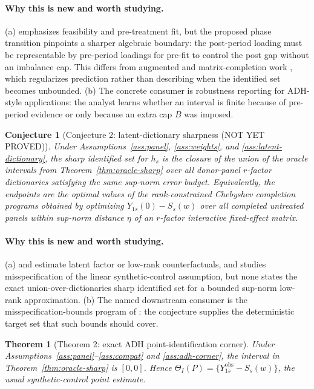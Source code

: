 \documentclass[11pt]{article}
\theoremstyle{definition}
\theoremstyle{plain}
\newtheorem{theorem}{Theorem}
\newtheorem{conjecture}{Conjecture}
\theoremstyle{remark}
\begin{document}
\paragraph{Why this is new and worth studying.}
(a) \citet{Abadie2021} emphasizes feasibility and pre-treatment fit, but the proposed phase transition pinpoints a sharper algebraic boundary: the post-period loading must be representable by pre-period loadings for pre-fit to control the post gap without an imbalance cap. This differs from augmented and matrix-completion work \citep{BenMichaelFellerRothstein2021,AtheyBayatiDoudchenkoImbensKhosravi2021}, which regularizes prediction rather than describing when the identified set becomes unbounded. (b) The concrete consumer is robustness reporting for ADH-style applications: the analyst learns whether an interval is finite because of pre-period evidence or only because an extra cap \(B\) was imposed.

\begin{conjecture}[Conjecture 2: latent-dictionary sharpness (NOT YET PROVED)]\label{conj:latent-dictionary}
Under Assumptions~\ref{ass:panel}, \ref{ass:weights}, and \ref{ass:latent-dictionary}, the sharp identified set for \(h_s\) is the closure of the union of the oracle intervals from Theorem~\ref{thm:oracle-sharp} over all donor-panel \(r\)-factor dictionaries satisfying the same sup-norm error budget. Equivalently, the endpoints are the optimal values of the rank-constrained Chebyshev completion programs obtained by optimizing \(Y_{1s}(0)-S_s(w)\) over all completed untreated panels within sup-norm distance \(\eta\) of an \(r\)-factor interactive fixed-effect matrix.
\end{conjecture}

\paragraph{Why this is new and worth studying.}
(a) \citet{Xu2017} and \citet{AtheyBayatiDoudchenkoImbensKhosravi2021} estimate latent factor or low-rank counterfactuals, and \citet{NazaretShiBlei2024} studies misspecification of the linear synthetic-control assumption, but none states the exact union-over-dictionaries sharp identified set for a bounded sup-norm low-rank approximation. (b) The named downstream consumer is the misspecification-bounds program of \citet{NazaretShiBlei2024}: the conjecture supplies the deterministic target set that such bounds should cover.

\begin{theorem}[Theorem 2: exact ADH point-identification corner]\label{thm:adh-corner}
Under Assumptions~\ref{ass:panel}--\ref{ass:compat} and \ref{ass:adh-corner}, the interval in Theorem~\ref{thm:oracle-sharp} is \([0,0]\). Hence \(\Theta_I(P)=\{Y^{\mathrm{obs}}_{1s}-S_s(w)\}\), the usual synthetic-control point estimate.
\end{theorem}
\end{document}
